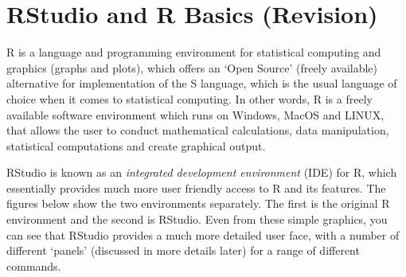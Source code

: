 \documentclass[
]{book}
\theoremstyle{definition}
\theoremstyle{definition}
\theoremstyle{definition}
\theoremstyle{definition}
\theoremstyle{remark}
\begin{document}
\hypertarget{rstudio-and-r-basics-revision}{%
\chapter{RStudio and R Basics (Revision)}\label{rstudio-and-r-basics-revision}}

R is a language and programming environment for statistical computing and graphics (graphs and plots), which offers an `Open Source' (freely available) alternative for implementation of the S language, which is the usual language of choice when it comes to statistical computing. In other words, R is a freely available software environment which runs on Windows, MacOS and LINUX, that allows the user to conduct mathematical calculations, data manipulation, statistical computations and create graphical output.

RStudio is known as an \emph{integrated development environment} (IDE) for R, which essentially provides much more user friendly access to R and its features. The figures below show the two environments separately. The first is the original R environment and the second is RStudio. Even from these simple graphics, you can see that RStudio provides a much more detailed user face, with a number of different `panels' (discussed in more details later) for a range of different commands.
\end{document}
